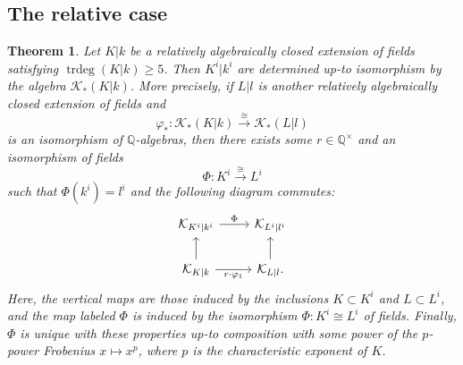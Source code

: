 \documentclass[12pt]{amsart}
\newcommand{\Qbb}{\mathbb{Q}}
\newcommand{\trdeg}{\operatorname{trdeg}}
\newcommand{\Kcal}{\mathcal{K}}
\renewcommand{\phi}{\varphi}
\newtheorem{theorem}{Theorem}[section]
\theoremstyle{definition}
\begin{document}
\subsection{The relative case}

\begin{theorem}\label{theorem:main_relative_Kcal}
  Let $K|k$ be a relatively algebraically closed extension of fields satisfying $\trdeg(K|k) \geq 5$.
  Then $K^{i}|k^{i}$ are determined up-to isomorphism by the algebra $\Kcal_{*}(K|k)$.
  More precisely, if $L|l$ is another relatively algebraically closed extension of fields and
  \[ \phi_{*} : \Kcal_{*}(K|k) \xrightarrow{\cong} \Kcal_{*}(L|l) \]
  is an isomorphism of $\Qbb$-algebras, then there exists some $r \in \Qbb^{\times}$ and an isomorphism of fields
  \[ \Phi : K^{i} \xrightarrow{\cong} L^{i} \]
  such that $\Phi(k^{i}) = l^{i}$ and the following diagram commutes:
  \[ \begin{tikzcd}
      \Kcal_{K^{i}|k^{i}} \ar[r,"\Phi"] & \Kcal_{L^{i}|l^{i}} \\
      \Kcal_{K|k} \ar[u] \ar[r,"r \cdot \phi_{1}"'] & \Kcal_{L|l}. \ar[u]
    \end{tikzcd}\]
  Here, the vertical maps are those induced by the inclusions $K \subset K^{i}$ and $L \subset L^{i}$, and the map labeled $\Phi$ is induced by the isomorphism $\Phi : K^{i} \cong L^{i}$ of fields.
  Finally, $\Phi$ is unique with these properties up-to composition with some power of the $p$-power Frobenius $x \mapsto x^{p}$, where $p$ is the characteristic exponent of $K$.
\end{theorem}
\end{document}
